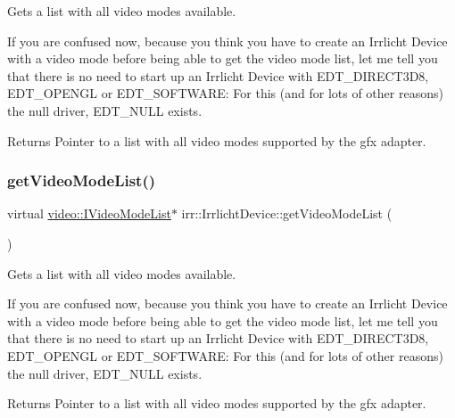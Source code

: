 Gets a list with all video modes available. 

If you are confused now, because you think you have to create an Irrlicht Device with a video mode before being able to get the video mode list, let me tell you that there is no need to start up an Irrlicht Device with E\+D\+T\+\_\+\+D\+I\+R\+E\+C\+T3\+D8, E\+D\+T\+\_\+\+O\+P\+E\+N\+GL or E\+D\+T\+\_\+\+S\+O\+F\+T\+W\+A\+RE\+: For this (and for lots of other reasons) the null driver, E\+D\+T\+\_\+\+N\+U\+LL exists. \begin{DoxyReturn}{Returns}
Pointer to a list with all video modes supported by the gfx adapter. 
\end{DoxyReturn}
\mbox{\label{classirr_1_1IrrlichtDevice_a8872867a5ad728a4673679e9e8f469e7}} 
\subsubsection{\texorpdfstring{get\+Video\+Mode\+List()}{getVideoModeList()}\hspace{0.1cm}{\footnotesize\ttfamily [3/3]}}
{\footnotesize\ttfamily virtual \hyperlink{classirr_1_1video_1_1IVideoModeList}{video\+::\+I\+Video\+Mode\+List}$\ast$ irr\+::\+Irrlicht\+Device\+::get\+Video\+Mode\+List (\begin{DoxyParamCaption}{ }\end{DoxyParamCaption})\hspace{0.3cm}{\ttfamily [pure virtual]}}



Gets a list with all video modes available. 

If you are confused now, because you think you have to create an Irrlicht Device with a video mode before being able to get the video mode list, let me tell you that there is no need to start up an Irrlicht Device with E\+D\+T\+\_\+\+D\+I\+R\+E\+C\+T3\+D8, E\+D\+T\+\_\+\+O\+P\+E\+N\+GL or E\+D\+T\+\_\+\+S\+O\+F\+T\+W\+A\+RE\+: For this (and for lots of other reasons) the null driver, E\+D\+T\+\_\+\+N\+U\+LL exists. \begin{DoxyReturn}{Returns}
Pointer to a list with all video modes supported by the gfx adapter. 
\end{DoxyReturn}
\mbox{\label{classirr_1_1IrrlichtDevice_a5a74995aec731b26c6a9cb5bea6842fe}} 
